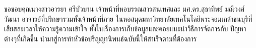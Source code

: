 \documentclass[12pt,oneside,openright,a4paper]{cpe-thai-project}
\begin{document}
\preface
ขอขอบคุณนางสาวอารยา ศรีบัวบาน เจ้าหน้าที่หอบรรณสารสนเทศและ ผศ.ดร.สุธาทิพย์ มณีวงศ์วัฒนา อาจารย์ที่ปรึกษารวมทั้งเจ้าหน้าที่ภาย
ในหอสมุดมหาวิทยาลัยเทคโนโลยีพระจอมเกล้าธนบุรีที่เสียสละเวลาให้ความรู้ความเข้าใจ ทั้งในเรื่องการเก็บข้อมูลและคอยแนะนำวิธีการจัดการกับ
ปัญหาต่างๆที่เกิดขึ้น นำมาสู่การทำหัวข้อปริญญานิพนธ์ฉบับนี้ให้สำเร็จตามที่ต้องการ 

\tableofcontents                    
\listoftables
\listoffigures                      

\end{document}
